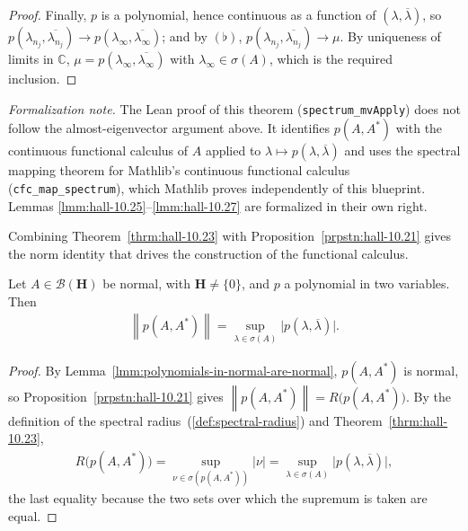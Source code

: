 \begin{proof}
Finally, $p$ is a polynomial, hence continuous as a function of $(\lambda,\overline\lambda)$, so $p(\lambda_{n_j},\overline{\lambda_{n_j}}) \to p(\lambda_\infty,\overline{\lambda_\infty})$; and by $(\flat)$, $p(\lambda_{n_j},\overline{\lambda_{n_j}}) \to \mu$. By uniqueness of limits in $\mathbb{C}$, $\mu = p(\lambda_\infty,\overline{\lambda_\infty})$ with $\lambda_\infty \in \sigma(A)$, which is the required inclusion.
\end{proof}

\noindent\textit{Formalization note.} The Lean proof of this theorem (\texttt{spectrum\_mvApply}) does not follow the almost-eigenvector argument above. It identifies $p(A,A^*)$ with the continuous functional calculus of $A$ applied to $\lambda \mapsto p(\lambda,\overline\lambda)$ and uses the spectral mapping theorem for Mathlib's continuous functional calculus (\texttt{cfc\_map\_spectrum}), which Mathlib proves independently of this blueprint. Lemmas \ref{lmm:hall-10.25}--\ref{lmm:hall-10.27} are formalized in their own right.

Combining Theorem~\ref{thrm:hall-10.23} with Proposition~\ref{prpstn:hall-10.21} gives the norm identity that drives the construction of the functional calculus.

\begin{corollary}
    \label{crllr:norm-of-polynomial-in-a-astar}
    \leanok
    Let $A \in \mathcal{B}(\mathbf{H})$ be normal, with $\mathbf{H} \ne \{0\}$, and $p$ a polynomial in two variables. Then
    \begin{align}
        \left\| p(A,A^*) \right\| = \sup_{\lambda \in \sigma(A)} \big\lvert p(\lambda,\overline\lambda) \big\rvert.
    \end{align}
\end{corollary}
\begin{proof}
    \leanok
By Lemma~\ref{lmm:polynomials-in-normal-are-normal}, $p(A,A^*)$ is normal, so Proposition~\ref{prpstn:hall-10.21} gives $\left\| p(A,A^*) \right\| = R\big( p(A,A^*) \big)$. By the definition of the spectral radius~(\ref{def:spectral-radius}) and Theorem~\ref{thrm:hall-10.23},
\begin{align}
    R\big( p(A,A^*) \big) = \sup_{\nu \in \sigma(p(A,A^*))} \lvert \nu \rvert = \sup_{\lambda \in \sigma(A)} \big\lvert p(\lambda,\overline\lambda) \big\rvert,
\end{align}
the last equality because the two sets over which the supremum is taken are equal.
\end{proof}

